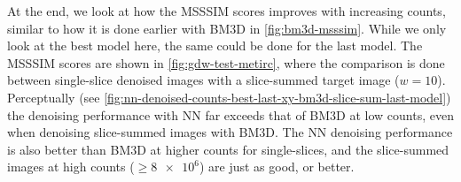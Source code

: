 At the end, we look at how the \gls{MSSSIM} scores improves with increasing counts, similar to how it is done earlier with BM3D in \cref{fig:bm3d-msssim}. While we only look at the best model here, the same could be done for the last model. The \gls{MSSSIM} scores are shown in \cref{fig:gdw-test-metirc}, where the comparison is done between single-slice denoised images with a slice-summed target image ($w=10$). Perceptually (see \cref{fig:nn-denoised-counts-best-last-xy-bm3d-slice-sum-last-model}) the denoising performance with \gls{NN} far exceeds that of BM3D at low counts, even when denoising slice-summed images with BM3D. The \gls{NN} denoising performance is also better than BM3D at higher counts for single-slices, and the slice-summed images at high counts ($\geq \num{8e6}$) are just as good, or better.











